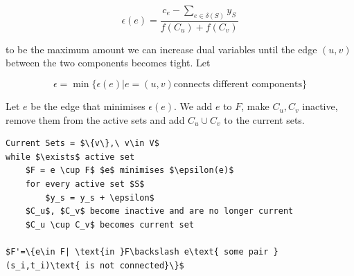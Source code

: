 \[\epsilon(e) = \frac{c_e - \sum_{e\in \delta(S)} y_S}{f(C_u)+f(C_v)}\]

to be the maximum amount we can increase dual variables until the edge $(u,v)$ between the two components becomes tight. Let 

\[\epsilon = \min \{\epsilon(e)|e=(u,v) \text{connects different components}\}\]

Let $e$ be the edge that minimises $\epsilon(e)$. We add $e$ to $F$, make $C_u,C_v$ inactive, remove them from the active sets and add $C_u\cup C_v$ to the current sets.

\begin{lstlisting}
Current Sets = $\{v\},\ v\in V$
while $\exists$ active set
	$F = e \cup F$ $e$ minimises $\epsilon(e)$
	for every active set $S$
		$y_s = y_s + \epsilon$
	$C_u$, $C_v$ become inactive and are no longer current
	$C_u \cup C_v$ becomes current set

$F'=\{e\in F| \text{in }F\backslash e\text{ some pair } (s_i,t_i)\text{ is not connected}\}$
\end{lstlisting}

